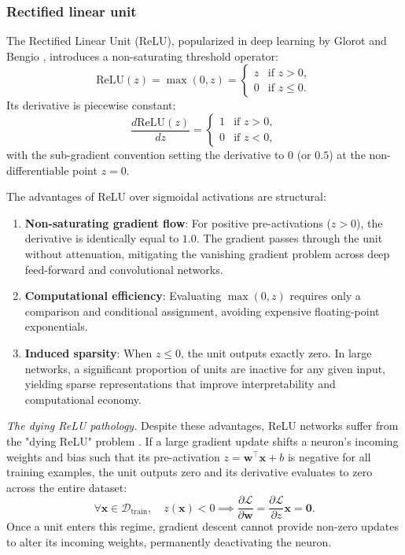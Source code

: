 \documentclass[../../main.tex]{subfiles}
\begin{document}
\subsubsection{Rectified linear unit}

The Rectified Linear Unit ($\text{ReLU}$), popularized in deep learning by Glorot and Bengio \citep{glorot2010}, introduces a non-saturating threshold operator:
\begin{equation}
\text{ReLU}(z) = \max(0, z) = \begin{cases} 
z & \text{if } z > 0, \\ 
0 & \text{if } z \le 0. 
\end{cases}
\end{equation}
Its derivative is piecewise constant:
\begin{equation}
\frac{d\text{ReLU}(z)}{dz} = \begin{cases} 
1 & \text{if } z > 0, \\ 
0 & \text{if } z < 0, 
\end{cases}
\end{equation}
with the sub-gradient convention setting the derivative to $0$ (or $0.5$) at the non-differentiable point $z = 0$.

The advantages of ReLU over sigmoidal activations are structural:
\begin{enumerate}[label=(\roman*)]
    \item \textbf{Non-saturating gradient flow}: For positive pre-activations ($z > 0$), the derivative is identically equal to $1.0$. The gradient passes through the unit without attenuation, mitigating the vanishing gradient problem across deep feed-forward and convolutional networks.
    \item \textbf{Computational efficiency}: Evaluating $\max(0, z)$ requires only a comparison and conditional assignment, avoiding expensive floating-point exponentials.
    \item \textbf{Induced sparsity}: When $z \le 0$, the unit outputs exactly zero. In large networks, a significant proportion of units are inactive for any given input, yielding sparse representations that improve interpretability and computational economy.
\end{enumerate}

\textit{The dying ReLU pathology.} Despite these advantages, ReLU networks suffer from the "dying ReLU" problem \citep{prince2023udl}. If a large gradient update shifts a neuron's incoming weights and bias such that its pre-activation $z = \mathbf{w}^\top \mathbf{x} + b$ is negative for all training examples, the unit outputs zero and its derivative evaluates to zero across the entire dataset:
\begin{equation}
\forall \mathbf{x} \in \mathcal{D}_{\text{train}}, \quad z(\mathbf{x}) < 0 \implies \frac{\partial \mathcal{L}}{\partial \mathbf{w}} = \frac{\partial \mathcal{L}}{\partial z} \mathbf{x} = \mathbf{0}.
\end{equation}
Once a unit enters this regime, gradient descent cannot provide non-zero updates to alter its incoming weights, permanently deactivating the neuron.
\end{document}
